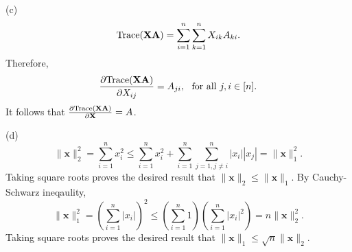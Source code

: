 \documentclass[11pt]{exam}
\theoremstyle{quest}
\begin{document}
(c)
\[
 \text{Trace(\textbf{XA})} = \sum_{i=1}^n \sum_{k=1}^n X_{ik}A_{ki}.
\]
Therefore, 
\[
\frac{\partial \text{Trace(\textbf{XA})}}{\partial X_{ij}} = A_{ji}, \,\, \text{ for all } j,i \in [n].
\]
It follows that  $\frac{\partial \text{Trace(\textbf{XA})}}{\partial \textbf{X}} = A$.

(d)
\[
\|\textbf{x}\|_2^2 = \sum_{i=1}^{n} x_i^2  \leq  \sum_{i=1}^{n} x_i^2  + \sum_{i=1}^n \sum_{j=1, j \neq i}^n |x_i| |x_j| = \|\textbf{x}\|_1^2.
\]
Taking square roots proves the desired result that $\|\textbf{x}\|_2 \leq \|\textbf{x}\|_1$.
By Cauchy-Schwarz ineqaulity,
\[
\|\textbf{x}\|_1^2 = (\sum_{i=1}^n |x_i|)^2 \leq (\sum_{i=1}^n 1)(\sum_{i=1}^n |x_i|^2) = n \|\textbf{x}\|_2^2.
\]
Taking square roots proves the desired result that $\|\textbf{x}\|_1 \leq \sqrt{n}\|\textbf{x}\|_2$.

\newpage

\end{document}
